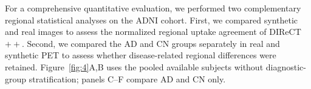 For a comprehensive quantitative evaluation, we performed two complementary regional statistical analyses on the ADNI cohort. First, we compared synthetic and real images to assess the normalized regional uptake agreement of DIReCT$++$. Second, we compared the AD and CN groups separately in real and synthetic PET to assess whether disease-related regional differences were retained. Figure~\ref{fig:4}A,B uses the pooled available subjects without diagnostic-group stratification; panels C--F compare AD and CN only.
